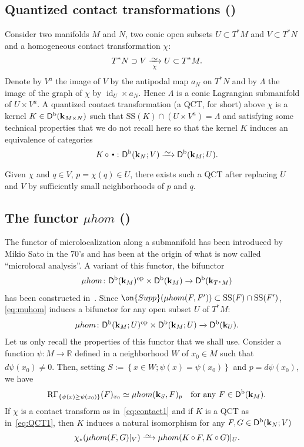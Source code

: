 \documentclass[12pt,leqno]{article}
\theoremstyle{definition}
\newcommand{\R}{{\mathbb{R}}}
\newcommand{\cor}{{\bf k}}
\renewcommand{\to}[1][]{\xrightarrow[]{#1}}
\newcommand{\isoto}[1][]{\xrightarrow[#1]%
{{\raisebox{-.6ex}[0ex][-.6ex]{$\mspace{1mu}\sim\mspace{2mu}$}}}}
\newcommand{\muhom}{\mu hom}
\newcommand{\rsect}{\mathrm{R}\Gamma}
\newcommand{\conv}[1][]{\mathop{\circ}\limits_{#1}}
\newcommand{\eqdot}{\mathbin{:=}}
\newcommand{\cl}{\colon}
\newcommand{\scbul}{{\,\raise.4ex\hbox{$\scriptscriptstyle\bullet$}\,}}
\newcommand{\eq}{\begin{eqnarray}}
\newcommand{\eneq}{\end{eqnarray}}
\newcommand{\eqn}{\begin{eqnarray*}}
\newcommand{\eneqn}{\end{eqnarray*}}
\newcommand{\set}[2]{\left\{#1 \mathbin{;} #2 \right\}}
\def\rop{{\rm op}}
\DeclareMathOperator{\id}{id}
\newcommand{\Supp}{\on{Supp}}
\newcommand{\Der}[1][]{\mathsf{D}^{#1}}
\newcommand{\Derb}{\Der[\mathrm{b}]}
\newcommand{\SSi}{\mathrm{SS}}
\numberwithin{equation}{section}
\begin{document}
\subsection{Quantized contact transformations (\cite[\S 7.2]{KS90})}
Consider two manifolds $M$ and $N$, two conic open subsets $U\subset T^*M$
and $V\subset T^*N$ and a homogeneous contact transformation $\chi$:
\eq\label{eq:contact1}
&& T^*N\supset V\isoto[\chi] U\subset T^*M.
\eneq
Denote by $V^a$ the image of $V$ by the antipodal map $a_N$ on $T^*N$ and by $\Lambda$
the image of the graph of $\chi$ by $\id_{U}\times a_N$. Hence
$\Lambda$ is a conic Lagrangian submanifold of $U\times V^a$.
A quantized contact transformation (a QCT, for short) above $\chi$ is a kernel
$K\in\Derb(\cor_{M\times N})$ such that 
$\SSi(K)\cap(U\times V^a)=\Lambda$ 
and satisfying some technical
properties that we do not recall here so that the kernel $K$ induces
an equivalence of categories 
\eq\label{eq:QCT1}
&&K\conv\scbul\cl\Derb(\cor_N;V)\isoto\Derb(\cor_M;U). 
\eneq
Given $\chi$ and $q\in V$,
$p=\chi(q)\in U$, there exists such a QCT after replacing $U$ and $V$
by sufficiently small neighborhoods of $p$ and $q$. 

\subsection{The functor $\muhom$ (\cite[\S 4.4, \S 7.2]{KS90})}
The functor of microlocalization along a submanifold has been introduced by
Mikio Sato in the 70's and has been at the origin of what is now called
``microlocal analysis''.  A variant of this functor, the bifunctor
\eq
&&\muhom\cl\Derb(\cor_M)^\rop\times\Derb(\cor_M)\to\Derb(\cor_{T^*M})
\label{eq:muhom}
\eneq
has been constructed in~\cite{KS90}.
Since $\Supp(\muhom(F,F'))\subset\SSi(F)\cap\SSi(F')$, 
\eqref{eq:muhom} induces a bifunctor for any open subset $U$ of $T^*M$:
\eqn
&&\muhom\cl\Derb(\cor_M;U)^\rop\times\Derb(\cor_M;U)\to\Derb(\cor_{U}).
\eneqn
Let us only recall the properties of this functor that we shall use.
Consider a function $\psi\cl M\to\R$ defined in a neighborhood 
$W$ of $x_0\in M$ such that $d\psi(x_0)\not=0$.
Then, 
setting $S\eqdot\set{x\in W}{\psi(x)=\psi(x_0)}$ and
$p=d\psi(x_0)$, we have 
\eqn
&&\rsect_{\{\psi(x)\geq\psi(x_0)\}}(F)_{x_0}\simeq\muhom(\cor_S,F)_p
\quad\text{for any $F\in\Derb(\cor_M)$.}
\eneqn
If $\chi$ is a contact transform as in~\eqref{eq:contact1}
and if $K$ is a QCT as in~\eqref{eq:QCT1}, then $K$ induces a natural
isomorphism for any $F,G\in\Derb(\cor_N;V)$ 
\eq\label{eq:QCT2}
&&\chi_*(\muhom(F,G)\vert_V)\isoto  \muhom(K\conv F,K\conv G)\vert_U.
\eneq
\end{document}
